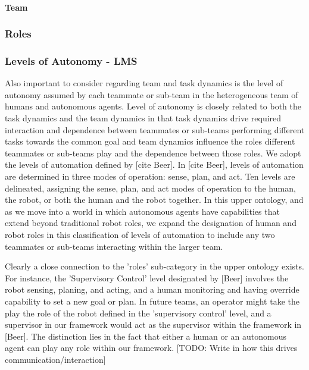 \documentclass[letterpaper, 10 pt, conference]{ieeeconf}  %
\theoremstyle{definition}
\begin{document}
\paragraph{Team}
\subsubsection{Roles}


\subsubsection{Levels of Autonomy - LMS}
Also important to consider regarding team and task dynamics is the level of autonomy assumed by each teammate or sub-team in the heterogeneous team of humans and autonomous agents. Level of autonomy is closely related to both the task dynamics and the team dynamics in that task dynamics drive required interaction and dependence between teammates or sub-teams performing different tasks towards the common goal and team dynamics influence the roles different teammates or sub-teams play and the dependence between those roles. We adopt the levels of automation defined by [cite Beer]. In [cite Beer], levels of automation are determined in three modes of operation: sense, plan, and act. Ten levels are delineated, assigning the sense, plan, and act modes of operation to the human, the robot, or both the human and the robot together. In this upper ontology, and as we move into a world in which autonomous agents have capabilities that extend beyond traditional robot roles, we expand the designation of human and robot roles in this classification of levels of automation to include any two teammates or sub-teams interacting within the larger team. 

Clearly a close connection to the 'roles' sub-category in the upper ontology exists. For instance, the 'Supervisory Control' level designated by [Beer] involves the robot sensing, planing, and acting, and a human monitoring and having override capability to set a new goal or plan. In future teams, an operator might take the play the role of the robot defined in the 'supervisory control' level, and a supervisor in our framework would act as the supervisor within the framework in [Beer]. The distinction lies in the fact that either a human or an autonomous agent can play any role within our framework. 
[TODO: Write in how this drives communication/interaction]
\end{document}
